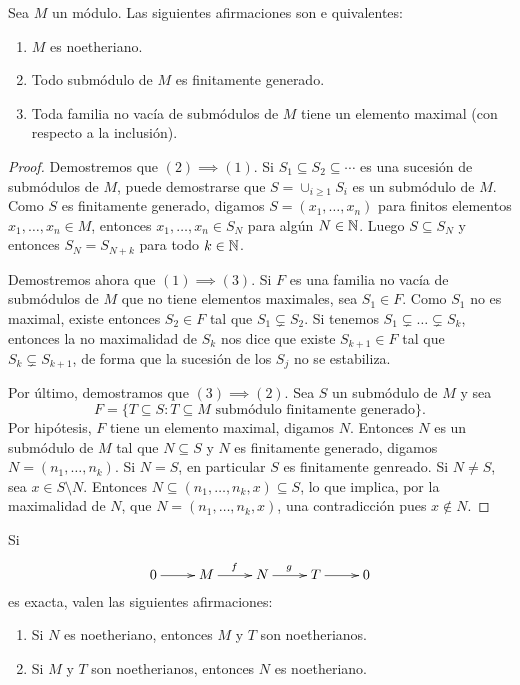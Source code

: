 \begin{proposition}
Sea $M$ un módulo. Las siguientes afirmaciones son e	quivalentes:
\begin{enumerate}
\item $M$ es noetheriano.
\item Todo submódulo de $M$ es finitamente generado.
\item Toda familia no vacía de submódulos de $M$ tiene un elemento maximal (con respecto a la inclusión).	
\end{enumerate}
\end{proposition}

\begin{proof}
	Demostremos que $(2)\implies(1)$. Si $S_1\subseteq S_2\subseteq\cdots$ es una sucesión de submódulos de $M$,
	puede demostrarse que $S=\cup_{i\geq 1}S_i$ es un submódulo de $M$. Como $S$ es finitamente generado,
	digamos $S=(x_1,\dots,x_n)$ para finitos elementos $x_1,\dots,x_n\in M$, entonces
	$x_1,\dots,x_n\in S_N$ para algún $N\in\mathbb{N}$. Luego $S\subseteq S_N$ y entonces $S_N=S_{N+k}$ para todo $k\in\mathbb{N}$. 
	
	Demostremos ahora que $(1)\implies(3)$. Si $F$ es una familia no vacía de submódulos de $M$ que no tiene
	elementos maximales, sea $S_1\in F$. Como $S_1$ no es maximal, existe entonces $S_2\in F$ tal que $S_1\subsetneq S_2$. 
	Si tenemos $S_1\subsetneq\dots\subsetneq S_k$, entonces la no maximalidad de $S_k$ nos dice que
	existe $S_{k+1}\in F$ tal que $S_k\subsetneq S_{k+1}$, de forma que la sucesión de los $S_j$ no se estabiliza. 
	
	Por último, demostramos que $(3)\implies(2)$. Sea $S$ un submódulo de $M$ y sea
	\[
	F=\{T\subseteq S:T\subseteq M\text{ submódulo finitamente generado}\}.
	\]
	Por hipótesis, $F$ tiene un elemento maximal, digamos $N$. Entonces $N$ es un submódulo de $M$ tal que $N\subseteq S$ y $N$
	es finitamente generado, digamos $N=(n_1,\dots,n_k)$. Si $N=S$, en particular $S$ es finitamente genreado. Si $N\ne S$, 
	sea  $x\in S\setminus N$. Entonces 
	$N\subseteq (n_1,\dots,n_k,x)\subseteq S$, lo que implica, por la maximalidad de $N$, que $N=(n_1,\dots,n_k,x)$, una contradicción
	pues $x\not\in N$. 
\end{proof}

\begin{exercise}
\label{xca:exacta_noetheriano}
	Si  
	\[  
		\xymatrix{
        0\ar[r]
        & M
        \ar[r]^f
        & N
        \ar[r]^g
        & T\ar[r]
        & 0	
        }
     \]
     es exacta, valen las siguientes afirmaciones:
     \begin{enumerate}
     	\item Si $N$ es noetheriano, entonces $M$ y $T$ son noetherianos.
     	\item Si $M$ y $T$ son noetherianos, entonces $N$ es noetheriano.
     \end{enumerate}	
\end{exercise}


